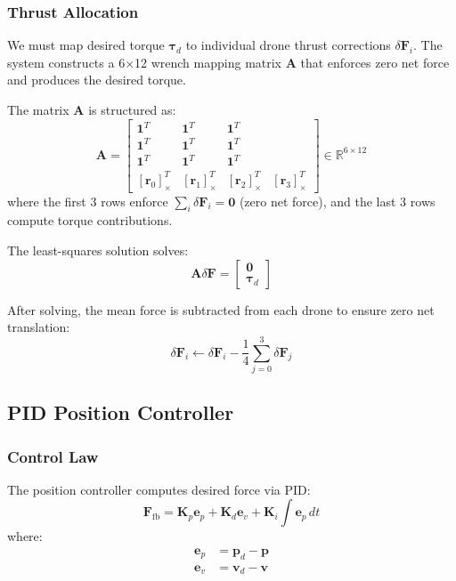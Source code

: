 \documentclass[12pt,a4paper]{article}
\begin{document}
\subsubsection{Thrust Allocation}
We must map desired torque $\boldsymbol{\tau}_d$ to individual drone thrust corrections $\delta\mathbf{F}_i$. The system constructs a 6×12 wrench mapping matrix $\mathbf{A}$ that enforces zero net force and produces the desired torque.

The matrix $\mathbf{A}$ is structured as:
\begin{equation}
    \mathbf{A} = \begin{bmatrix} 
    \mathbf{1}^T & \mathbf{1}^T & \mathbf{1}^T \\
    \mathbf{1}^T & \mathbf{1}^T & \mathbf{1}^T \\
    \mathbf{1}^T & \mathbf{1}^T & \mathbf{1}^T \\
    \hline
    [\mathbf{r}_0]_\times^T & [\mathbf{r}_1]_\times^T & [\mathbf{r}_2]_\times^T & [\mathbf{r}_3]_\times^T
    \end{bmatrix} \in \mathbb{R}^{6 \times 12}
    \label{eq:wrench_matrix}
\end{equation}
where the first 3 rows enforce $\sum_i \delta\mathbf{F}_i = \mathbf{0}$ (zero net force), and the last 3 rows compute torque contributions.

The least-squares solution solves:
\begin{equation}
    \mathbf{A}\delta\mathbf{F} = \begin{bmatrix} \mathbf{0} \\ \boldsymbol{\tau}_d \end{bmatrix}
    \label{eq:thrust_allocation}
\end{equation}

After solving, the mean force is subtracted from each drone to ensure zero net translation:
\begin{equation}
    \delta\mathbf{F}_i \leftarrow \delta\mathbf{F}_i - \frac{1}{4}\sum_{j=0}^{3}\delta\mathbf{F}_j
\end{equation}

\subsection{PID Position Controller}

\subsubsection{Control Law}
The position controller computes desired force via PID:
\begin{equation}
    \mathbf{F}_{\text{fb}} = \mathbf{K}_p\mathbf{e}_p + \mathbf{K}_d\mathbf{e}_v + \mathbf{K}_i\int \mathbf{e}_p \, dt
    \label{eq:pid}
\end{equation}
where:
\begin{align}
    \mathbf{e}_p &= \mathbf{p}_d - \mathbf{p} \\
    \mathbf{e}_v &= \mathbf{v}_d - \mathbf{v}
\end{align}
\end{document}
